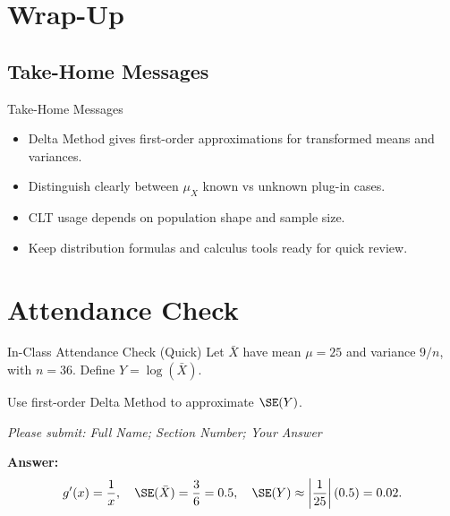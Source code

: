 \documentclass[aspectratio=169]{beamer}
\begin{document}
\section{Wrap-Up}

\subsection{Take-Home Messages}
\begin{frame}{Take-Home Messages}
  \begin{itemize}
    \item Delta Method gives first-order approximations for transformed means and variances.
    \item Distinguish clearly between \(\mu_X\) known vs unknown plug-in cases.
    \item CLT usage depends on population shape and sample size.
    \item Keep distribution formulas and calculus tools ready for quick review.
  \end{itemize}
\end{frame}

\section{Attendance Check}

\begin{frame}{In-Class Attendance Check (Quick)}
  Let \(\bar{X}\) have mean \(\mu=25\) and variance \(9/n\), with \(n=36\).
  Define \(Y=\log(\bar{X})\).

  Use first-order Delta Method to approximate \(\SE(Y)\).

  \vspace{3mm}
  \textit{Please submit: Full Name; Section Number; Your Answer}

  \pause
  \vspace{2mm}
  \textbf{Answer:}
  \[
    g'(x)=\frac{1}{x},\quad
    \SE(\bar{X})=\frac{3}{6}=0.5,\quad
    \SE(Y)\approx \left|\frac{1}{25}\right|(0.5)=0.02.
  \]
\end{frame}
\end{document}
